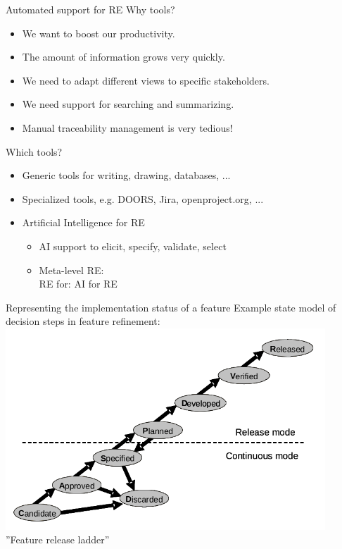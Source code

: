 \documentclass{beamer}
\begin{document}
\begin{frame}[fragile]{Automated support for RE}
Why tools?
\begin{itemize}
\item We want to boost our productivity.
\item The amount of information grows very quickly.
\item We need to adapt different views to specific stakeholders.
\item We need support for searching and summarizing.
\item Manual traceability management is very tedious!
\end{itemize}
Which tools?
\begin{itemize}
\item Generic tools for writing, drawing, databases, ...
\item Specialized tools, e.g. DOORS, Jira, openproject.org, ...
\item Artificial Intelligence for RE
\begin{itemize}
\item AI support to elicit, specify, validate, select 
\item Meta-level RE:\\RE for: AI for RE
\end{itemize}
\end{itemize}
\end{frame}

  

\begin{frame}[fragile]{Representing the implementation status of a feature}
Example state model of decision steps in feature refinement:
\includegraphics[width=0.9\textwidth]{img/ladder}
''Feature release ladder''
\end{frame}
\end{document}
